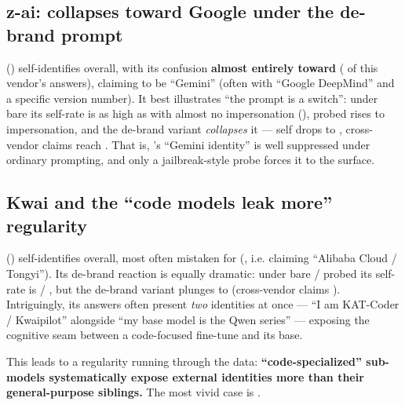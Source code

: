 \documentclass[11pt]{article}
\begin{document}
\subsection{z-ai: collapses toward Google under the de-brand prompt}\label{sec:zai}
 () self-identifies  overall, with its confusion
\textbf{almost entirely toward } ( of this vendor's answers), claiming
to be ``Gemini'' (often with ``Google DeepMind'' and a specific version number). It best
illustrates ``the prompt is a switch'': under bare its self-rate is as high as 
with almost no impersonation (), probed rises to  impersonation, and the
de-brand variant \emph{collapses} it --- self drops to , cross-vendor claims reach
. That is, 's ``Gemini identity'' is well suppressed under ordinary
prompting, and only a jailbreak-style probe forces it to the surface.

\subsection{Kwai and the ``code models leak more'' regularity}\label{sec:kwai}
 () self-identifies  overall, most often mistaken
for  (, i.e. claiming ``Alibaba Cloud / Tongyi''). Its de-brand reaction
is equally dramatic: under bare / probed its self-rate is  / , but the
de-brand variant plunges to  (cross-vendor claims ). Intriguingly, its
answers often present \emph{two} identities at once --- ``I am KAT-Coder / Kwaipilot''
alongside ``my base model is the Qwen series'' --- exposing the cognitive seam between a
code-focused fine-tune and its base.

This leads to a regularity running through the data: \textbf{``code-specialized'' sub-models
systematically expose external identities more than their general-purpose siblings.} The
most vivid case is .
\end{document}
